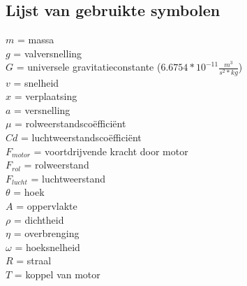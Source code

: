 \subsection{Lijst van gebruikte symbolen}
\label{bijlage:gebruikte-symbolen}
$m$ = massa\\
$g$ = valversnelling\\
$G$ = universele gravitatieconstante ($6.6754*10^{-11} \frac{m^3}{s^2*kg}$)\\
$v$ = snelheid\\
$x$ = verplaatsing\\
$a$ = versnelling\\
$\mu$ = rolweerstandsco\"effici\"ent\\ 
$Cd$ = luchtweerstandsco\"effici\"ent\\
$F_{motor}$ = voortdrijvende kracht door motor\\
$F_{rol}$ = rolweerstand\\
$F_{lucht}$ = luchtweerstand\\
$\theta$ = hoek\\
$A$ = oppervlakte\\
$\rho$ = dichtheid\\
$\eta$ = overbrenging\\
$\omega$ = hoeksnelheid\\
$R$ = straal\\
$T$ = koppel van motor\\

